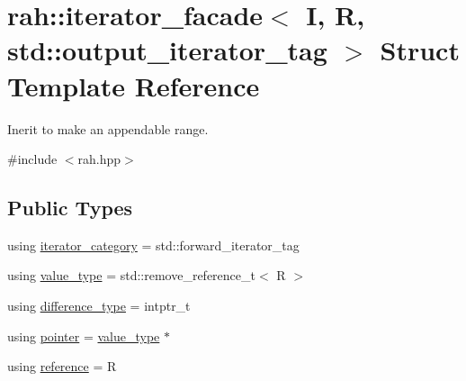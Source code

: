 \hypertarget{structrah_1_1iterator__facade_3_01_i_00_01_r_00_01std_1_1output__iterator__tag_01_4}{}\section{rah\+::iterator\+\_\+facade$<$ I, R, std\+::output\+\_\+iterator\+\_\+tag $>$ Struct Template Reference}
\label{structrah_1_1iterator__facade_3_01_i_00_01_r_00_01std_1_1output__iterator__tag_01_4}


Inerit to make an appendable range.  




{\ttfamily \#include $<$rah.\+hpp$>$}

\subsection*{Public Types}
\begin{DoxyCompactItemize}
\item 
using \mbox{\hyperlink{structrah_1_1iterator__facade_3_01_i_00_01_r_00_01std_1_1output__iterator__tag_01_4_aea9805a7e6e6fa707e827522d25a2c62}{iterator\+\_\+category}} = std\+::forward\+\_\+iterator\+\_\+tag
\item 
using \mbox{\hyperlink{structrah_1_1iterator__facade_3_01_i_00_01_r_00_01std_1_1output__iterator__tag_01_4_aeafcf4359545a589d72a23f8500e9b74}{value\+\_\+type}} = std\+::remove\+\_\+reference\+\_\+t$<$ R $>$
\item 
using \mbox{\hyperlink{structrah_1_1iterator__facade_3_01_i_00_01_r_00_01std_1_1output__iterator__tag_01_4_a98026d696f26da59a6b8a2bc85a4e8d1}{difference\+\_\+type}} = intptr\+\_\+t
\item 
using \mbox{\hyperlink{structrah_1_1iterator__facade_3_01_i_00_01_r_00_01std_1_1output__iterator__tag_01_4_a7d1e657a8d01cc9f8adca5477b017ccb}{pointer}} = \mbox{\hyperlink{structrah_1_1iterator__facade_3_01_i_00_01_r_00_01std_1_1output__iterator__tag_01_4_aeafcf4359545a589d72a23f8500e9b74}{value\+\_\+type}} $\ast$
\item 
using \mbox{\hyperlink{structrah_1_1iterator__facade_3_01_i_00_01_r_00_01std_1_1output__iterator__tag_01_4_aa6a95e1b55444933973b7fe4a63512e2}{reference}} = R
\end{DoxyCompactItemize}
